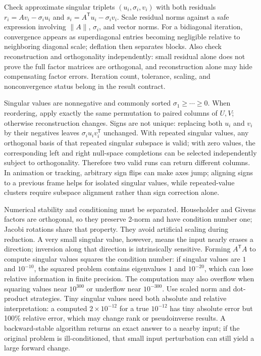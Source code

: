 Check approximate singular triplets \((u_i,\sigma_i,v_i)\) with both residuals \(r_i=Av_i-\sigma_i u_i\) and \(s_i=A^\mathsf Tu_i-\sigma_i v_i\). Scale residual norms against a safe expression involving \(\|A\|\), \(\sigma_i\), and vector norms. For a bidiagonal iteration, convergence appears as superdiagonal entries becoming negligible relative to neighboring diagonal scale; deflation then separates blocks. Also check reconstruction and orthogonality independently: small residual alone does not prove the full factor matrices are orthogonal, and reconstruction alone may hide compensating factor errors. Iteration count, tolerance, scaling, and nonconvergence status belong in the result contract.

Singular values are nonnegative and commonly sorted \(\sigma_1\ge\cdots\ge0\). When reordering, apply exactly the same permutation to paired columns of \(U,V\); otherwise reconstruction changes. Signs are not unique: replacing both \(u_i\) and \(v_i\) by their negatives leaves \(\sigma_i u_iv_i^\mathsf T\) unchanged. With repeated singular values, any orthogonal basis of that repeated singular subspace is valid; with zero values, the corresponding left and right null-space completions can be selected independently subject to orthogonality. Therefore two valid runs can return different columns. In animation or tracking, arbitrary sign flips can make axes jump; aligning signs to a previous frame helps for isolated singular values, while repeated-value clusters require subspace alignment rather than sign correction alone.

Numerical stability and conditioning must be separated. Householder and Givens factors are orthogonal, so they preserve 2-norm and have condition number one; Jacobi rotations share that property. They avoid artificial scaling during reduction. A very small singular value, however, means the input nearly erases a direction; inversion along that direction is intrinsically sensitive. Forming \(A^\mathsf TA\) to compute singular values squares the condition number: if singular values are \(1\) and \(10^{-10}\), the squared problem contains eigenvalues \(1\) and \(10^{-20}\), which can lose relative information in finite precision. The computation may also overflow when squaring values near \(10^{300}\) or underflow near \(10^{-300}\). Use scaled norm and dot-product strategies. Tiny singular values need both absolute and relative interpretation: a computed \(2\times10^{-12}\) for a true \(10^{-12}\) has tiny absolute error but 100\% relative error, which may change rank or pseudoinverse results. A backward-stable algorithm returns an exact answer to a nearby input; if the original problem is ill-conditioned, that small input perturbation can still yield a large forward change.

